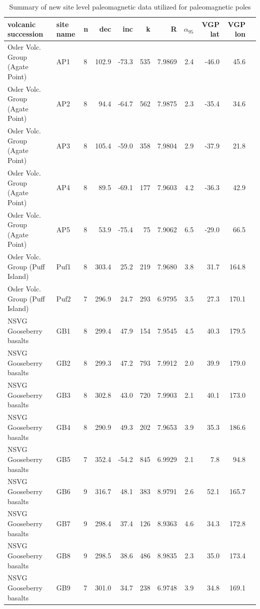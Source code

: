 \documentclass[11pt,letterpaper]{article}
\begin{document}
\begin{table}[h!]
\footnotesize
\caption{Summary of new site level paleomagnetic data utilized for paleomagnetic poles}
\begin{tabular}{|l|l|l|r|r|r|r|r|r|r|r|}
\hline
volcanic succession & site name & n & dec & inc & k & R & $\alpha_{95}$ & VGP lat & VGP lon \\
\hline
Osler Volc. Group (Agate Point) & AP1 &  8 &  102.9 & -73.3 &  535 &  7.9869 &  2.4 & -46.0 &  45.6 \\
Osler Volc. Group (Agate Point) & AP2 &  8 &  94.4 & -64.7 &  562 &  7.9875 &  2.3 & -35.4 &  34.6 \\
Osler Volc. Group (Agate Point) & AP3 &  8 &  105.4 & -59.0 &  358 &  7.9804 &  2.9 & -37.9 &  21.8 \\
Osler Volc. Group (Agate Point) & AP4 &  8 &  89.5 & -69.1 &  177 &  7.9603 &  4.2 & -36.3 &  42.9 \\
Osler Volc. Group (Agate Point) & AP5 &  8 &  53.9 & -75.4 &  75 &  7.9062 &  6.5 & -29.0 &  66.5 \\
Osler Volc. Group (Puff Island) & Puf1 &  8 &  303.4 &  25.2 &  219 &  7.9680 &  3.8 &  31.7 &  164.8 \\
Osler Volc. Group (Puff Island) & Puf2 &  7 &  296.9 &  24.7 &  293 &  6.9795 &  3.5 &  27.3 &  170.1 \\
NSVG Gooseberry basalts & GB1 &  8 &  299.4 &  47.9 &  154 &  7.9545 &  4.5 &  40.3 &  179.5 \\
NSVG Gooseberry basalts & GB2 &  8 &  299.3 &  47.2 &  793 &  7.9912 &  2.0 &  39.9 &  179.0 \\
NSVG Gooseberry basalts & GB3 &  8 &  302.8 &  43.0 &  720 &  7.9903 &  2.1 &  40.1 &  173.0 \\
NSVG Gooseberry basalts & GB4 &  8 &  290.9 &  49.3 &  202 &  7.9653 &  3.9 &  35.3 &  186.6 \\
NSVG Gooseberry basalts & GB5 &  7 &  352.4 & -54.2 &  845 &  6.9929 &  2.1 &  7.8 &  94.8 \\
NSVG Gooseberry basalts & GB6 &  9 &  316.7 &  48.1 &  383 &  8.9791 &  2.6 &  52.1 &  165.7 \\
NSVG Gooseberry basalts & GB7 &  9 &  298.4 &  37.4 &  126 &  8.9363 &  4.6 &  34.3 &  172.8 \\
NSVG Gooseberry basalts & GB8 &  9 &  298.5 &  38.6 &  486 &  8.9835 &  2.3 &  35.0 &  173.4 \\
NSVG Gooseberry basalts & GB9 &  7 &  301.0 &  34.7 &  238 &  6.9748 &  3.9 &  34.8 &  169.1 \\

\end{tabular}
\end{table}
\end{document}
